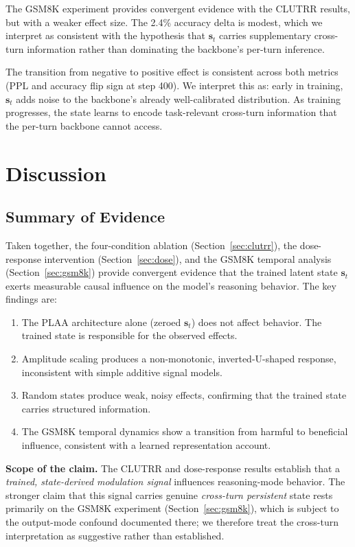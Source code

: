 \documentclass[11pt,a4paper]{article}
\begin{document}
The GSM8K experiment provides convergent evidence with the CLUTRR results, but with a weaker effect size. The 2.4\% accuracy delta is modest, which we interpret as consistent with the hypothesis that $\mathbf{s}_t$ carries supplementary cross-turn information rather than dominating the backbone's per-turn inference.

The transition from negative to positive effect is consistent across both metrics (PPL and accuracy flip sign at step 400). We interpret this as: early in training, $\mathbf{s}_t$ adds noise to the backbone's already well-calibrated distribution. As training progresses, the state learns to encode task-relevant cross-turn information that the per-turn backbone cannot access.

\section{Discussion}
\label{sec:discussion}

\subsection{Summary of Evidence}

Taken together, the four-condition ablation (Section~\ref{sec:clutrr}), the dose-response intervention (Section~\ref{sec:dose}), and the GSM8K temporal analysis (Section~\ref{sec:gsm8k}) provide convergent evidence that the trained latent state $\mathbf{s}_t$ exerts measurable causal influence on the model's reasoning behavior. The key findings are:

\begin{enumerate}
    \item The PLAA architecture alone (zeroed $\mathbf{s}_t$) does not affect behavior. The trained state is responsible for the observed effects.
    \item Amplitude scaling produces a non-monotonic, inverted-U-shaped response, inconsistent with simple additive signal models.
    \item Random states produce weak, noisy effects, confirming that the trained state carries structured information.
    \item The GSM8K temporal dynamics show a transition from harmful to beneficial influence, consistent with a learned representation account.
\end{enumerate}

\textbf{Scope of the claim.} The CLUTRR and dose-response results establish that a \emph{trained, state-derived modulation signal} influences reasoning-mode behavior. The stronger claim that this signal carries genuine \emph{cross-turn persistent} state rests primarily on the GSM8K experiment (Section~\ref{sec:gsm8k}), which is subject to the output-mode confound documented there; we therefore treat the cross-turn interpretation as suggestive rather than established.
\end{document}
